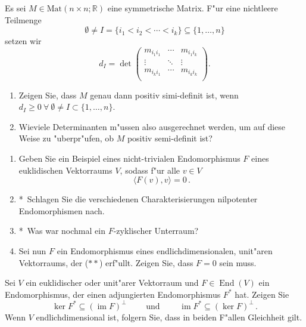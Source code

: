 \documentclass[a4,11pt]{article}
\DeclareMathOperator{\End}{End}
\DeclareMathOperator{\im}{im}
\newcommand{\bonusitem}{\item\hspace*{-2.4mm}*\ }
\begin{document}
\vspace*{-17mm}
{
\kopf
}



\begin{aufgabe}[4 Punkte]
Es sei $M \in \text{Mat}(n \times n; \mathbb{R})$ eine symmetrische Matrix. F"ur eine nichtleere Teilmenge 
\[
\emptyset \neq I = \{ i_1 < i_2 < \cdots < i_k \} \subseteq \{ 1, \dots, n\}
\]
setzen wir
\[
d_I = \det \begin{pmatrix} m_{i_1 i_1} & \cdots & m_{i_1 i_k} \\ \vdots & \ddots & \vdots \\ m_{i_k i_1} & \cdots & m_{i_k i_k} \\ \end{pmatrix}.
\]
\begin{enumerate}
\item
Zeigen Sie, dass $M$ genau dann positiv simi-definit ist, wenn $d_I \geq 0 \ \forall  \ \emptyset \neq I \subset \{ 1, \dots, n\}$.
\item
Wieviele Determinanten m"ussen also ausgerechnet werden, um auf diese Weise zu "uberpr"ufen, ob $M$ positiv semi-definit ist?
\end{enumerate}
\end{aufgabe}

\begin{aufgabe}[4 Punkte]
  \begin{enumerate}
  \item Geben Sie ein Beispiel eines nicht-trivialen Endomorphismus
    $F$ eines euklidischen Vektorraums $V$, sodass f"ur alle $v \in V$
    \begin{equation}
      \tag{$**$}
      \langle F(v), v \rangle = 0 \,.
    \end{equation}
  \bonusitem Schlagen Sie die verschiedenen Charakterisierungen nilpotenter
  Endomorphismen nach.
  \bonusitem Was war nochmal ein $F$-zyklischer Unterraum?
  \item Sei nun $F$ ein Endomorphismus eines endlichdimensionalen,
    unit"aren Vektorraums, der ($**$) erf"ullt. Zeigen Sie, dass $F=0$ sein muss.
  \end{enumerate}
\end{aufgabe}

\begin{aufgabe}[4 Punkte]
  Sei $V$ ein euklidischer oder unit"arer Vektorraum und $F
  \in \End(V)$ ein Endomorphismus, der einen adjungierten
  Endomorphismus $F^*$ hat. Zeigen Sie
  $$
  \ker F^* \subseteq (\im F)^\perp \qquad \text{ und } \qquad \im F^*
  \subseteq (\ker F)^\perp \,.
  $$
  Wenn $V$ endlichdimensional ist, folgern Sie, dass in beiden F"allen
  Gleichheit gilt.
\end{aufgabe}

\end{document}
